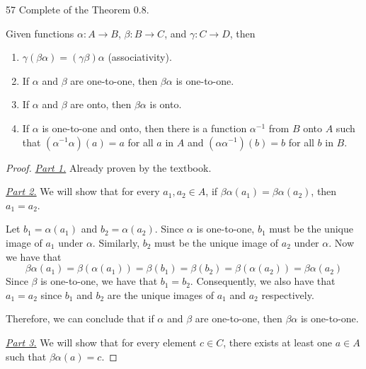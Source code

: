 \begin{hwproblem}
{57}{
    Complete of the Theorem 0.8.
}
    
\begin{theorem}
    Given functions \(\alpha: A \to B\), \(\beta: B \to C\), and \(\gamma: C \to D\), then
    \begin{enumerate}
        \item $\gamma(\beta \alpha)=(\gamma \beta) \alpha$ (associativity).
        \item If $\alpha$ and $\beta$ are one-to-one, then $\beta \alpha$ is one-to-one.
        \item If $\alpha$ and $\beta$ are onto, then $\beta \alpha$ is onto.
        \item If $\alpha$ is one-to-one and onto, then there is a function $\alpha^{-1}$ from $B$ onto $A$ such that $\left(\alpha^{-1} \alpha\right)(a)=a$ for all $a$ in $A$ and $\left(\alpha \alpha^{-1}\right)(b)=b$ for all $b$ in $B$.
    \end{enumerate}
\end{theorem}

\begin{proof}
    \phantom{pain}

    \underline{\textit{Part 1.}} Already proven by the textbook.

    \underline{\textit{Part 2.}} We will show that for every \(a_1, a_2 \in A\), if \(\beta\alpha(a_1) = \beta\alpha(a_2)\), then \(a_1 = a_2\).

    Let \(b_1 = \alpha(a_1)\) and \(b_2 = \alpha(a_2)\). Since \(\alpha\) is one-to-one, \(b_1\) must be the unique image of \(a_1\) under \(\alpha\). Similarly, \(b_2\) must be the unique image of \(a_2\) under \(\alpha\). Now we have that
    \[
        \beta\alpha(a_1) = \beta(\alpha(a_1)) = \beta(b_1) = \beta(b_2) = \beta(\alpha(a_2)) = \beta\alpha(a_2)
    \]
    Since \(\beta\) is one-to-one, we have that \(b_1 = b_2\). Consequently, we also have that \(a_1 = a_2\) since \(b_1\) and \(b_2\) are the unique images of \(a_1\) and \(a_2\) respectively.

    Therefore, we can conclude that if \(\alpha\) and \(\beta\) are one-to-one, then \(\beta\alpha\) is one-to-one.

    \underline{\textit{Part 3.}} We will show that for every element \(c \in C\), there exists at least one \(a \in A\) such that \(\beta\alpha(a) = c\).


\end{proof}
\end{hwproblem}
